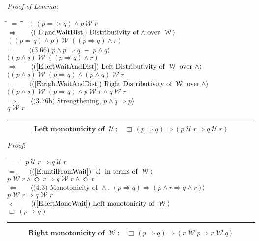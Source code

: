 \documentclass[12pt, fleqn, leqno]{article}
\newcommand{\lgap}{2pt}                             %
\newcommand{\mymathindent}{24pt}                    %
\newcommand{\equivs}{\ensuremath{\;\equiv\;}}       %
\newcommand{\impl}{\ensuremath{\Rightarrow}}        %
\newcommand{\foll}{\ensuremath{\Leftarrow}}         %
\newcommand{\Until}{\;\mathcal{U}\;}
\newcommand{\Wait}{\;\mathcal{W}\;}
\newcommand{\Event}{\Diamond\,}
\newcommand{\Always}{\Box\,}
\newcommand{\myqed}{\rule[-.23ex]{1.2ex}{2.0ex}}
\newcommand{\myqedtab}{\hspace{384pt}}              %
\newcommand{\Gll} {\langle}                         %
\newcommand{\Ggg} {\rangle}                         %
\newcommand{\Hint}[1]     {\ \ \ $\Gll              \mbox{#1} \Ggg$ }   %
\begin{document}
\emph{Proof of Lemma:}
\begin{tabbing}
\hspace{\mymathindent} \= $= \;$ \= \myqedtab \= \kill
  \> \>   $\Always (p => q) \land p \Wait r$\\[\lgap]
  \> $\impl$  \>  \Hint{(\ref{E:andWaitDist}) Distributivity of $\land$ over $\Wait$}\\[\lgap]
  \> \>   $((p \impl q) \land p) \Wait ((p \impl q) \land r)$\\[\lgap]
  \> $=$  \>  \Hint{(3.66) $p\land p \impl q \equivs  p \land q$}\\[\lgap]
  \> \>   $((p \land q) \Wait ((p \impl q) \land r)$\\[\lgap]
  \> $\impl$  \>  \Hint{(\ref{E:leftWaitAndDist}) Left Distributivity of $\Wait$ over $\land$}\\[\lgap]
  \> \>   $((p \land q) \Wait (p \impl q) \land (p \land q) \Wait r$\\[\lgap]
  \> $=$  \>  \Hint{(\ref{E:rightWaitAndDist}) Right Distributivity of $\Wait$ over $\land$}\\[\lgap]
  \> \>   $((p \land q) \Wait (p \impl q) \land p \Wait r \land q \Wait r$\\[\lgap]
  \> $\impl$ \> \Hint{(3.76b) Strengthening, $p\land q \impl p$} \\[\lgap]
  \> \>   $q \Wait r$ \quad \myqed
\end{tabbing}
\begin{equation}\label{E:leftMonoUntil}
\textbf{Left monotonicity of $\Until$:}\quad \Always (p \impl q) \impl (p \Until r \impl q \Until r)
\end{equation}

\emph{Proof}:
\begin{tabbing}
\hspace{\mymathindent} \= $= \;$ \= \myqedtab \= \kill
  \> \>   $p \Until r \impl q \Until r$\\[\lgap]
  \> $=$ \> \Hint{(\ref{E:untilFromWait}) $\Until$ in terms of $\Wait$} \\[\lgap]
  \> \>   $p \Wait r \land \Event r\impl q \Wait r \land \Event r$\\[\lgap]
  \> $\foll$  \>  \Hint{(4.3) Monotonicity of $\land$, $(p\impl q)\impl (p\land r \impl q\land r)$}\\[\lgap]
  \> \>   $p \Wait r \impl q \Wait r$\\[\lgap]
  \> $\foll$  \>  \Hint{(\ref{E:leftMonoWait}) Left monotonicity of $\Wait$}\\[\lgap]
  \> \>   $\Always (p \impl q)$ \quad \myqed
\end{tabbing}
\begin{equation}\label{E:rightMonoWait}
\textbf{Right monotonicity of $\Wait$:}\quad \Always (p \impl q) \impl (r \Wait p \impl r \Wait q)
\end{equation}
\end{document}
